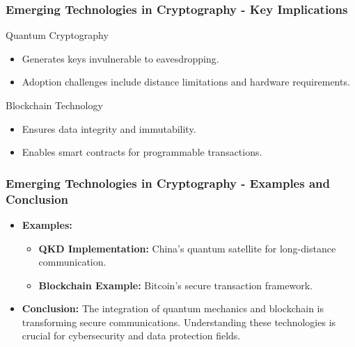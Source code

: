 \documentclass{beamer}
\begin{document}
\begin{frame}[fragile]
    \frametitle{Emerging Technologies in Cryptography - Key Implications}
    
    \begin{block}{Quantum Cryptography}
        \begin{itemize}
            \item Generates keys invulnerable to eavesdropping.
            \item Adoption challenges include distance limitations and hardware requirements.
        \end{itemize}
    \end{block}
    
    \begin{block}{Blockchain Technology}
        \begin{itemize}
            \item Ensures data integrity and immutability.
            \item Enables smart contracts for programmable transactions.
        \end{itemize}
    \end{block}
\end{frame}

\begin{frame}[fragile]
    \frametitle{Emerging Technologies in Cryptography - Examples and Conclusion}

    \begin{itemize}
        \item \textbf{Examples:}
        \begin{itemize}
            \item \textbf{QKD Implementation:} China's quantum satellite for long-distance communication.
            \item \textbf{Blockchain Example:} Bitcoin's secure transaction framework.
        \end{itemize}

        \item \textbf{Conclusion:} 
        The integration of quantum mechanics and blockchain is transforming secure communications. Understanding these technologies is crucial for cybersecurity and data protection fields.
    \end{itemize}
\end{frame}
\end{document}

